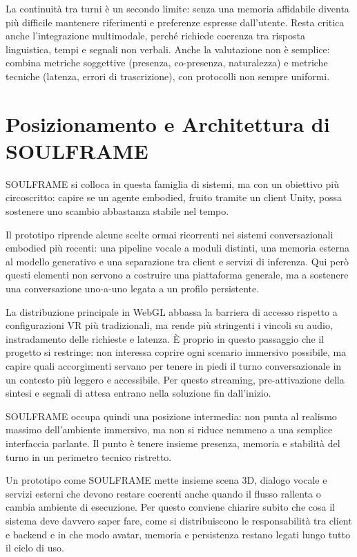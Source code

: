 La continuità tra turni è un secondo limite: senza una memoria affidabile diventa più difficile mantenere riferimenti e preferenze espresse dall'utente. Resta critica anche l'integrazione multimodale, perché richiede coerenza tra risposta linguistica, tempi e segnali non verbali. Anche la valutazione non è semplice: combina metriche soggettive (presenza, co-presenza, naturalezza) e metriche tecniche (latenza, errori di trascrizione), con protocolli non sempre uniformi.

\section{Posizionamento e Architettura di SOULFRAME}
\label{sec:soulframe-positioning}\label{sec:architettura-soulframe}
SOULFRAME si colloca in questa famiglia di sistemi, ma con un obiettivo più circoscritto: capire se un agente embodied, fruito tramite un client Unity, possa sostenere uno scambio abbastanza stabile nel tempo.

Il prototipo riprende alcune scelte ormai ricorrenti nei sistemi conversazionali embodied più recenti: una pipeline vocale a moduli distinti, una memoria esterna al modello generativo e una separazione tra client e servizi di inferenza. Qui però questi elementi non servono a costruire una piattaforma generale, ma a sostenere una conversazione uno-a-uno legata a un profilo persistente.

La distribuzione principale in WebGL abbassa la barriera di accesso rispetto a configurazioni VR più tradizionali, ma rende più stringenti i vincoli su audio, instradamento delle richieste e latenza. È proprio in questo passaggio che il progetto si restringe: non interessa coprire ogni scenario immersivo possibile, ma capire quali accorgimenti servano per tenere in piedi il turno conversazionale in un contesto più leggero e accessibile. Per questo streaming, pre-attivazione della sintesi e segnali di attesa entrano nella soluzione fin dall'inizio.

SOULFRAME occupa quindi una posizione intermedia: non punta al realismo massimo dell'ambiente immersivo, ma non si riduce nemmeno a una semplice interfaccia parlante. Il punto è tenere insieme presenza, memoria e stabilità del turno in un perimetro tecnico ristretto.

Un prototipo come SOULFRAME mette insieme scena 3D, dialogo vocale e servizi esterni che devono restare coerenti anche quando il flusso rallenta o cambia ambiente di esecuzione. Per questo conviene chiarire subito che cosa il sistema deve davvero saper fare, come si distribuiscono le responsabilità tra client e backend e in che modo avatar, memoria e persistenza restano legati lungo tutto il ciclo di uso.

